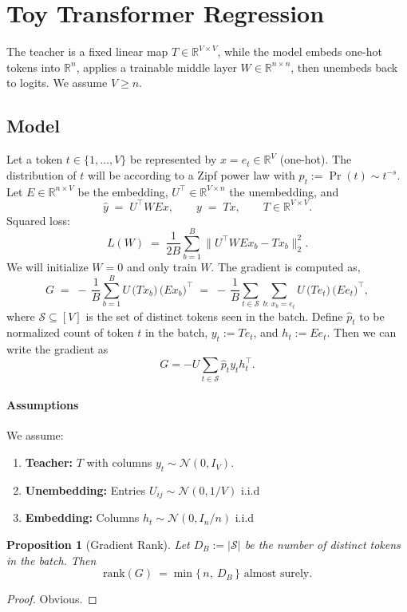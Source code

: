 \documentclass[11pt]{article}
\newtheorem{proposition}{Proposition}
\theoremstyle{definition}
\newcommand{\cN}{\mathcal{N}}
\begin{document}
\section{Toy Transformer Regression}

The teacher is a fixed linear map $T\in\mathbb{R}^{V\times V}$, while the model embeds one-hot tokens into $\mathbb{R}^n$, applies a trainable middle layer $W\in\mathbb{R}^{n\times n}$, then unembeds back to logits. We assume $V \geq n$.

\subsection*{Model}
Let a token $t\in\{1,\dots,V\}$ be represented by $x=e_t\in\mathbb{R}^V$ (one-hot). The distribution of $t$ will be according to a Zipf power law with $p_t := \Pr(t) \sim t^{-s}$. Let $E\in\mathbb{R}^{n\times V}$ be the embedding, $U^\top\in\mathbb{R}^{V\times n}$ the unembedding, and
\[
\hat y \;=\; U^\top W E x,\qquad y \;=\; T x,\qquad T\in\mathbb{R}^{V\times V}.
\]
Squared loss:
\[
L(W)\;=\;\frac{1}{2B}\sum_{b=1}^B \big\|U^\top W E x_b - T x_b\big\|_2^2.
\]
We will initialize $W = 0$ and only train $W$. The gradient is computed as,
\begin{equation}\label{eq:Gx-decoupled}
G \;=\; -\,\frac1B \sum_{b=1}^B U\, \big(T x_b\big)\, \big(E x_b\big)^\top
\;=\; -\,\frac1B \sum_{t\in \mathcal{S}} \sum_{b:\,x_b=e_t} U\,\big(T e_t\big)\,\big(E e_t\big)^\top,
\end{equation}
where $\mathcal{S}\subseteq[V]$ is the set of distinct tokens seen in the batch. Define $\hat{p}_t$ to be normalized count of token $t$ in the batch, $y_t := Te_t$, and $h_t := Ee_t$. Then we can write the gradient as
\[
    G = -U \sum\limits_{t \in \mathcal{S}} \hat{p}_t y_t h_t^\top.
\]

\paragraph{Assumptions}
We assume:
\begin{enumerate}[left=1.3em, itemsep=2pt, topsep=2pt]
\item \textbf{Teacher:} $T$ with columns $y_t \sim \cN(0, I_V)$.
\item \textbf{Unembedding:} Entries $U_{ij} \sim \cN(0, 1/V)$ i.i.d
\item \textbf{Embedding:} Columns $h_t \sim \cN(0, I_n / n)$ i.i.d
\end{enumerate}

\begin{proposition}[Gradient Rank]\label{prop:rankToy-decoupled}
Let $D_B:=|\mathcal{S}|$ be the number of distinct tokens in the batch. Then
\[
\mathrm{rank}(G)\ = \min\{\,n,\ D_B\,\} \text{ almost surely}.
\]
\end{proposition}
\begin{proof}
Obvious.
\end{proof}
\end{document}
